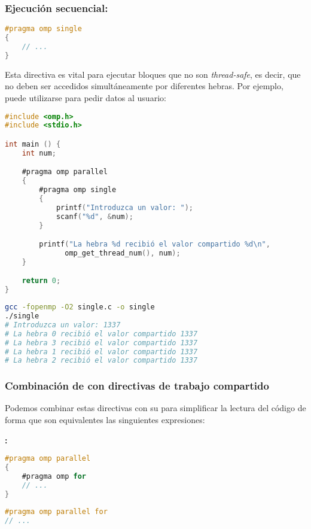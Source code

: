 \subsubsection{Ejecución secuencial: }

\begin{lstlisting}[language=C]
#pragma omp single
{
	// ...
}
\end{lstlisting}

Esta directiva es vital para ejecutar bloques que no son \textit{thread-safe}, es decir, que no deben ser accedidos simultáneamente por diferentes hebras.
Por ejemplo, puede utilizarse para pedir datos al usuario:

\begin{lstlisting}[language=C]
#include <omp.h>
#include <stdio.h>

int main () {
	int num;

	#pragma omp parallel
	{
		#pragma omp single
		{
			printf("Introduzca un valor: ");
			scanf("%d", &num);
		}

		printf("La hebra %d recibió el valor compartido %d\n",
	          omp_get_thread_num(), num);
	}

	return 0;
}
\end{lstlisting}

\begin{lstlisting}[language=sh]
gcc -fopenmp -O2 single.c -o single
./single
# Introduzca un valor: 1337
# La hebra 0 recibió el valor compartido 1337
# La hebra 3 recibió el valor compartido 1337
# La hebra 1 recibió el valor compartido 1337
# La hebra 2 recibió el valor compartido 1337
\end{lstlisting}

\subsubsection{Combinación de  con directivas de trabajo compartido}

Podemos combinar estas directivas con su  para simplificar la lectura del código de forma que son equivalentes las singuientes expresiones:

\textbf{:}

\begin{lstlisting}[language=C]
#pragma omp parallel
{
	#pragma omp for
	// ...
}
\end{lstlisting}

\begin{lstlisting}[language=C]
#pragma omp parallel for
// ...
\end{lstlisting}

